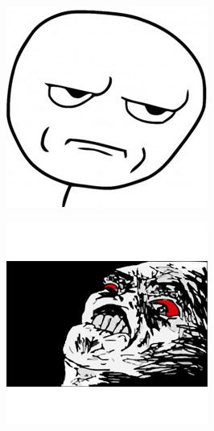 \begin{multicols}{8}
\begin{center}
\includegraphics[width=\linewidth]{./IMG-GIT/MEMES/Meme-Faces-30.jpg}  
\end{center}

\begin{center}
\includegraphics[width=\linewidth]{./IMG-GIT/MEMES/Meme-Faces-3.jpg} 
\end{center}


\end{multicols}

